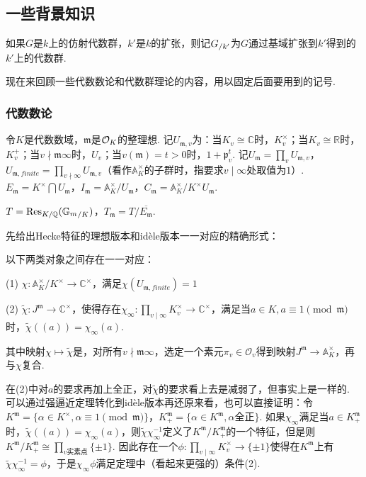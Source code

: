\subsection{一些背景知识}

如果$G$是$k$上的仿射代数群，$k'$是$k$的扩张，则记${G}_{/k'}$为$G$通过基域扩张到$k'$得到的$k'$上的代数群.

现在来回顾一些代数数论和代数群理论的内容，用以固定后面要用到的记号.

\subsubsection{代数数论}

令$K$是代数数域，$\mathfrak{m}$是$\mathcal{O}_K$的整理想. 记$U_{\mathfrak{m}, v}$为：当$K_v \cong \mathbb{C}$时，$K_v^{\times}$；当$K_v\cong \mathbb{R}$时，$K_v^{+}$；当$v\nmid\mathfrak{m}\infty$时，$U_{v}$；当$v(\mathfrak{m})=t>0$时，$1+\mathfrak{p}_v^{t}$. 记$U_{\mathfrak{m}}=\prod_v U_{\mathfrak{m}, v}$，$U_{\mathfrak{m}, finite} = \prod_{v\nmid \infty}U_{\mathfrak{m}, v}$（看作$\mathbb{A}_K^{\times}$的子群时，指要求$v\mid \infty$处取值为$1$）. $E_{\mathfrak{m}} = K^{\times} \bigcap U_{\mathfrak{m}}$，$I_{\mathfrak{m}} = \mathbb{A}_K^{\times}/U_{\mathfrak{m}}$，$C_{\mathfrak{m}} = \mathbb{A}_K^{\times} / K^{\times}U_{\mathfrak{m}}$.

$T = \mathrm{Res}_{K/\mathbb{Q}}({\mathbb{G}_m}_{/K})$，$T_{\mathfrak{m}} = T / \overline{E_{\mathfrak{m}}}$.

先给出Hecke特征的理想版本和idèle版本一一对应的精确形式：

\begin{cthm}
    以下两类对象之间存在一一对应：

    (1) $\chi: \mathbb{A}_K^{\times}/K^{\times} \to \mathbb{C}^{\times}$，满足$\chi(U_{\mathfrak{m}, finite}) = 1$

    (2) $\tilde{\chi}: J^{\mathfrak{m}}\to \mathbb{C}^{\times}$，使得存在$\chi_{\infty}:\prod_{v\mid \infty}K_v^{\times} \to \mathbb{C}^{\times}$，满足当$a\in K, a\equiv 1\pmod{\mathfrak{m}}$时，$\tilde{\chi}((a)) = \chi_{\infty}(a)$.

    其中映射$\chi\mapsto \tilde{\chi}$是，对所有$v\nmid \mathfrak{m}\infty$，选定一个素元$\pi_v\in \mathcal{O}_v$得到映射$J^{\mathfrak{m}}\to \mathbb{A}_K^{\times}$，再与$\chi$复合.
\end{cthm}

\begin{crem}
    在(2)中对$a$的要求再加上全正，对$\tilde{\chi}$的要求看上去是减弱了，但事实上是一样的. 可以通过强逼近定理转化到idèle版本再还原来看，也可以直接证明：令$K^{\mathfrak{m}} = \{\alpha\in K^{\times}, \alpha\equiv 1\pmod{\mathfrak{m}}\}$，$K^{\mathfrak{m}}_{+} = \{\alpha\in K^{\mathfrak{m}}, \alpha 全正\}$. 如果$\chi_{\infty}$满足当$a\in K^{\mathfrak{m}}_{+}$时，$\tilde{\chi}((a)) = \chi_{\infty}(a)$，则$\tilde{\chi}\chi_{\infty}^{-1}$定义了$K^{\mathfrak{m}}/K^{\mathfrak{m}}_{+}$的一个特征，但是则$K^{\mathfrak{m}}/K^{\mathfrak{m}}_{+} \cong \prod_{v实素点} \{\pm 1\}$. 因此存在一个$\phi: \prod_{v\mid \infty} K_v^{\times}\to \{\pm 1\}$使得在$K^{\mathfrak{m}}$上有$\tilde{\chi}\chi_{\infty}^{-1} = \phi$，于是$\chi_{\infty}\phi$满足定理中（看起来更强的）条件(2).
\end{crem}

